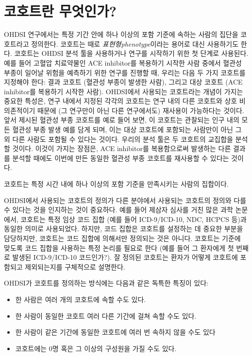 \documentclass[10.5pt]{book}
\providecommand{\tightlist}{%
  \setlength{\itemsep}{0pt}\setlength{\parskip}{0pt}}
\theoremstyle{definition}
\theoremstyle{definition}
\theoremstyle{definition}
\theoremstyle{remark}
\let\BeginKnitrBlock\begin \let\EndKnitrBlock\end
\begin{document}
\section{코호트란 무엇인가?}\label{-}

OHDSI 연구에서는 특정 기간 안에 하나 이상의 포함 기준에 속하는 사람의
집단을 코호트라고 정의한다. 코호트는 때로 \emph{표현형phenotype}이라는
용어로 대신 사용하기도 한다. 코호트는 OHDSI 분석 툴을 사용하거나 연구를
시작하기 위한 첫 단계로 사용된다. 예를 들어 고혈압 치료약물인 ACE
inhibitor를 복용하기 시작한 사람 중에서 혈관성 부종이 일어날 위험을
예측하기 위한 연구를 진행할 때, 우리는 다음 두 가지 코호트를 지정해야
한다: 결과 코호트 (혈관성 부종이 발생한 사람), 그리고 대상 코호트 (ACE
inhibitor를 복용하기 시작한 사람). OHDSI에서 사용되는 코호트라는 개념이
가지는 중요한 특성은, 연구 내에서 지정된 각각의 코호트는 연구 내의 다른
코호트와 상호 비의존적이기 때문에 (그 연구만이 아닌 다른 연구에서도)
재사용이 가능하다는 것이다. 앞서 제시된 혈관성 부종 코호트를 예로 들어
보면, 이 코호트는 관찰되는 인구 내의 모든 혈관성 부종 발생 예를 담게
되며, 이는 대상 코호트에 포함되는 사람만이 아닌 그 외 다른 사람도 포함될
수 있다는 것이다. 우리의 분석 툴은 두 코호트의 교집합을 분석할 것이다.
이것이 가지는 장점은, ACE inhibitor를 복용함으로써 발생하는 다른 결과를
분석할 때에도 이번에 만든 동일한 혈관성 부종 코호트를 재사용할 수 있다는
것이다.

\BeginKnitrBlock{rmdimportant}
코호트는 특정 시간 내에 하나 이상의 포함 기준을 만족시키는 사람의
집합이다.
\EndKnitrBlock{rmdimportant}

  OHDSI에서 사용되는 코호트의
정의가 다른 분야에서 사용되는 코호트의 정의와 다를 수 있다는 것을
인지하는 것이 중요하다. 예를 들어 제삼자 심사를 거친 많은 과학 논문에서,
코호트는 특정 임상 코드 집합 (예를 들어 ICD-9/ICD-10, NDC, HCPCS 등)과
동일한 의미로 사용되었다. 하지만, 코드 집합은 코호트를 설정하는 데
중요한 부분을 담당하지만, 코호트는 코드 집합에 의해서만 정의되는 것은
아니다. 코호트는 기준에 맞도록 코드 집합을 사용하는 특정 논리를 필요로
한다 (예를 들어 그 환자에게 첫 번째로 발생된 ICD-9/ICD-10 코드인가?). 잘
정의된 코호트는 환자가 어떻게 코호트에 포함되고 제외되는지를 구체적으로
설명한다. 

 OHDSI가 코호트를 정의하는 방식에는 다음과 같은 독특한
특징이 있다:

\begin{itemize}
\tightlist
\item
  한 사람은 여러 개의 코호트에 속할 수도 있다.
\item
  한 사람이 동일한 코호트 여러 다른 기간에 걸쳐 속할 수도 있다.
\item
  한 사람이 같은 기간에 동일한 코호트에 여러 번 속하지 않을 수도 있다
\item
  코호트에는 0명 혹은 그 이상의 구성원을 가질 수도 있다.
\end{itemize}
\end{document}
